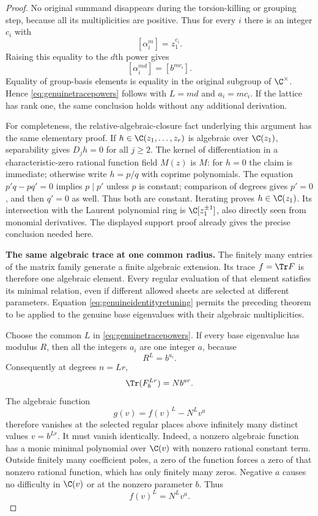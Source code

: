 \documentclass[11pt,a4paper]{article}
\theoremstyle{named}\newtheorem{finding}{Finding}[section]
\theoremstyle{definition}\newtheorem{definition}[finding]{Definition}
\theoremstyle{remark}\newtheorem{remark}[finding]{Remark}
\begin{document}
\begin{proof}
No original summand disappears during the torsion-killing
or grouping step, because all its multiplicities are
positive. Thus for every $i$ there is an integer $c_i$
with
\[
 [\alpha_i^m]=z_1^{c_i}.
\]
Raising this equality to the $d$th power gives
\[
 [\alpha_i^{md}]=[b^{mc_i}].
\]
Equality of group-basis elements is equality in the
original subgroup of $\C^\times$.
Hence \eqref{eq:genuinetracepowers} follows with
$L=md$ and $a_i=mc_i$.
If the lattice has rank one, the same conclusion holds
without any additional derivation.

For completeness, the relative-algebraic-closure fact
underlying this argument has the same elementary proof.
If $h\in\C(z_1,\ldots,z_r)$ is algebraic over $\C(z_1)$,
separability gives $D_jh=0$ for all $j\ge2$.
The kernel of differentiation in a characteristic-zero
rational function field $M(z)$ is $M$:
for $h=0$ the claim is immediate; otherwise write
$h=p/q$ with coprime polynomials.
The equation $p'q-pq'=0$ implies $p\mid p'$ unless
$p$ is constant; comparison of degrees gives $p'=0$,
and then $q'=0$ as well.
Thus both are constant.
Iterating proves $h\in\C(z_1)$.
Its intersection with the Laurent polynomial ring is
$\C[z_1^{\pm1}]$, also directly seen from monomial
derivatives. The displayed support proof already gives
the precise conclusion needed here.

\par\smallskip\noindent\textbf{The same algebraic trace at one common radius.}\quad
The finitely many entries of the matrix family generate
a finite algebraic extension.
Its trace $f=\Tr F$ is therefore one algebraic element.
Every regular evaluation of that element satisfies
its minimal relation, even if different allowed sheets
are selected at different parameters.
Equation \eqref{eq:genuineidentityretuning} permits the
preceding theorem to be applied to the genuine base
eigenvalues with their algebraic multiplicities.

Choose the common $L$ in \eqref{eq:genuinetracepowers}.
If every base eigenvalue has modulus $R$, then all
the integers $a_i$ are one integer $a$, because
\[
 R^L=b^{a_i}.
\]
Consequently at degrees $n=Lr$,
\[
 \Tr(F_b^{Lr})=N b^{ar}.
\]
The algebraic function
\[
 g(v)=f(v)^L-N^L v^a
\]
therefore vanishes at the selected regular places
above infinitely many distinct values $v=b^{Lr}$.
It must vanish identically.
Indeed, a nonzero algebraic function has a monic
minimal polynomial over $\C(v)$ with nonzero rational
constant term. Outside finitely many coefficient
poles, a zero of the function forces a zero of that
nonzero rational function, which has only finitely
many zeros.
Negative $a$ causes no difficulty in $\C(v)$ or
at the nonzero parameter $b$.
Thus
\begin{equation}\label{eq:commonradiustraceidentity}
 f(v)^L=N^L v^a.
\end{equation}


\end{proof}
\end{document}
